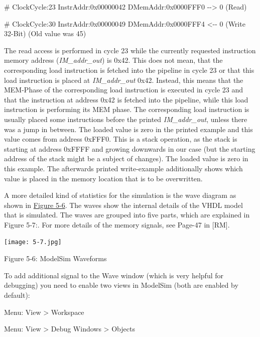 \documentclass[
]{article}
\begin{document}
\# ClockCycle:23 InstrAddr:0x00000042 DMemAddr:0x0000FFF0
-\/-\textgreater{} 0 (Read)

\# ClockCycle:30 InstrAddr:0x00000049 DMemAddr:0x0000FFF4 \textless-\/-
0 (Write 32-Bit) (Old value was 45)

The read access is performed in cycle 23 while the currently requested
instruction memory address (\emph{IM\_addr\_out}) is 0x42. This does not
mean, that the corresponding load instruction is fetched into the
pipeline in cycle 23 or that this load instruction is placed at
\emph{IM\_addr\_out} 0x42. Instead, this means that the MEM-Phase of the
corresponding load instruction is executed in cycle 23 and that the
instruction at address 0x42 is fetched into the pipeline, while this
load instruction is performing its MEM phase. The corresponding load
instruction is usually placed some instructions before the printed
\emph{IM\_addr\_out}, unless there was a jump in between. The loaded
value is zero in the printed example and this value comes from address
0xFFF0. This is a stack operation, as the stack is starting at address
0xFFFF and growing downwards in our case (but the starting address of
the stack might be a subject of changes). The loaded value is zero in
this example. The afterwards printed write-example additionally shows
which value is placed in the memory location that is to be overwritten.

A more detailed kind of statistics for the simulation is the wave
diagram as shown in \protect\hyperlink{Fig56}{Figure 5-6}. The waves
show the internal details of the VHDL model that is simulated. The waves
are grouped into five parts, which are explained in Figure 5‑7:. For
more details of the memory signals, see Page-47 in {[}RM{]}.

\texttt{[image: 5-7.jpg]}

Figure 5‑6:\protect\hypertarget{Fig56}{}{} ModelSim Waveforms

To add additional signal to the Wave window (which is very helpful for
debugging) you need to enable two views in ModelSim (both are enabled by
default):

Menu: View \textgreater{} Workspace

Menu: View \textgreater{} Debug Windows \textgreater{} Objects
\end{document}
